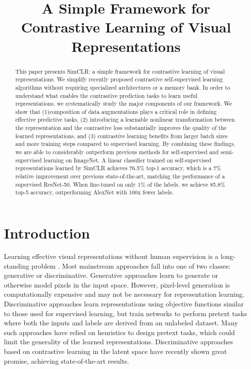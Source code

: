 \documentclass[conference]{IEEEtran}
\begin{document}
\title{A Simple Framework for Contrastive Learning of Visual Representations}

\author{
}

\maketitle

\begin{abstract}
This paper presents SimCLR: a simple framework for contrastive learning of visual representations.
We simplify recently proposed contrastive self-supervised learning algorithms without requiring specialized architectures or a memory bank.
In order to understand what enables the contrastive prediction tasks to learn useful representations, we systematically study the major components of our framework.
We show that (1)composition of data augmentations plays a critical role in defining effective predictive tasks,
(2) introducing a learnable nonlinear transformation between the representation and the contrastive loss substantially improves the quality of the learned representations,
and (3) contrastive learning benefits from larger batch sizes and more training steps compared to supervised learning.
By combining these findings, we are able to considerably outperform previous methods for self-supervised and semi-supervised learning on ImageNet.
A linear classifier trained on self-supervised representations learned by SimCLR achieves 76.5\% top-1 accuracy, which is a 7\% relative improvement over previous state-of-the-art, matching the performance of a supervised ResNet-50.
When fine-tuned on only 1\% of the labels, we achieve 85.8\% top-5 accuracy, outperforming AlexNet with 100x fewer labels.
\end{abstract}

\section{Introduction}
Learning effective visual representations without human supervision is a long-standing problem \cite{b1}.
Most mainstream approaches fall into one of two classes: generative or discriminative. Generative approaches learn to generate or otherwise model pixels in the input space.
However, pixel-level generation is computationally expensive and may not be necessary for representation learning.
Discriminative approaches learn representations using objective functions similar to those used for supervised learning, but train networks to perform pretext tasks where both the inputs and labels are derived from an unlabeled dataset.
Many such approaches have relied on heuristics to design pretext tasks, which could limit the generality of the learned representations. Discriminative approaches based on contrastive learning in the latent space have recently shown great promise, achieving state-of-the-art results.
\end{document}
